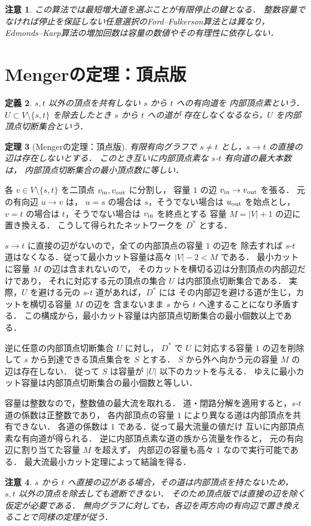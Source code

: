 \documentclass[a5paper,10pt,onecolumn]{jsarticle}
\makeatletter
\theoremstyle{mathnotetheorem}
\newtheorem{theorem}{定理}[section]
\newtheorem{definition}[theorem]{定義}
\newtheorem{remark}[theorem]{注意}
\renewcommand{\proofname}{証明}
\renewenvironment{proof}[1][\proofname]{%
  \par\pushQED{\qed}\normalfont\topsep4\p@\@plus2\p@\relax
  \trivlist\item[\hskip\labelsep\bfseries #1]\ignorespaces
}{\popQED\endtrivlist\@endpefalse}
\makeatother
\begin{document}
\begin{remark}
この算法では最短増大道を選ぶことが有限停止の鍵となる．
整数容量でなければ停止を保証しない任意選択のFord--Fulkerson算法とは異なり，
Edmonds--Karp算法の増加回数は容量の数値やその有理性に依存しない．
\end{remark}

\section{Mengerの定理：頂点版}
\begin{definition}
$s,t$ 以外の頂点を共有しない $s$ から $t$ への有向道を
\emph{内部頂点素}という．
$U\subset V\setminus\{s,t\}$ を除去したとき $s$ から $t$ への道が
存在しなくなるなら，$U$ を\emph{内部頂点切断集合}という．
\end{definition}
\begin{theorem}[Mengerの定理：頂点版]\label{thm:vertex-menger}
有限有向グラフで $s\ne t$ とし，$s\to t$ の直接の辺は存在しないとする．
このとき互いに内部頂点素な $s$-$t$ 有向道の最大本数は，
内部頂点切断集合の最小頂点数に等しい．
\end{theorem}
\begin{proof}
各 $v\in V\setminus\{s,t\}$ を二頂点 $v_{\rm in},v_{\rm out}$ に分割し，
容量 $1$ の辺 $v_{\rm in}\to v_{\rm out}$ を張る．
元の有向辺 $u\to v$ は，
$u=s$ の場合は $s$，そうでない場合は $u_{\rm out}$ を始点とし，
$v=t$ の場合は $t$，そうでない場合は $v_{\rm in}$ を終点とする
容量 $M=|V|+1$ の辺に置き換える．
こうして得られたネットワークを $D^*$ とする．

$s\to t$ に直接の辺がないので，全ての内部頂点の容量 $1$ の辺を
除去すれば $s$-$t$ 道はなくなる．従って最小カット容量は高々 $|V|-2<M$ である．
最小カットに容量 $M$ の辺は含まれないので，
そのカットを横切る辺は分割頂点の内部辺だけであり，
それに対応する元の頂点の集合 $U$ は内部頂点切断集合である．
実際，$U$ を避ける元の $s$-$t$ 道があれば，$D^*$ には
その内部辺を避ける道が生じ，カットを横切る容量 $M$ の辺を
含まないまま $s$ から $t$ へ達することになり矛盾する．
この構成から，最小カット容量は内部頂点切断集合の最小個数以上である．

逆に任意の内部頂点切断集合 $U$ に対し，
$D^*$ で $U$ に対応する容量 $1$ の辺を削除して
$s$ から到達できる頂点集合を $S$ とする．
$S$ から外へ向かう元の容量 $M$ の辺は存在しない．
従って $S$ は容量が $|U|$ 以下のカットを与える．
ゆえに最小カット容量は内部頂点切断集合の最小個数と等しい．

容量は整数なので，整数値の最大流を取れる．
道・閉路分解を適用すると，$s$-$t$ 道の係数は正整数であり，
各内部頂点の容量 $1$ により異なる道は内部頂点を共有できない．
各道の係数は $1$ である．従って最大流量の値だけ
互いに内部頂点素な有向道が得られる．
逆に内部頂点素な道の族から流量を作ると，
元の有向辺に割り当てた容量 $M$ を超えず，
内部辺の容量も高々 $1$ なので実行可能である．
最大流最小カット定理によって結論を得る．
\end{proof}
\begin{remark}
$s$ から $t$ へ直接の辺がある場合，その道は内部頂点を持たないため，
$s,t$ 以外の頂点を除去しても遮断できない．
そのため頂点版では直接の辺を除く仮定が必要である．
無向グラフに対しても，各辺を両方向の有向辺で置き換えることで同様の定理が従う．
\end{remark}
\end{document}
